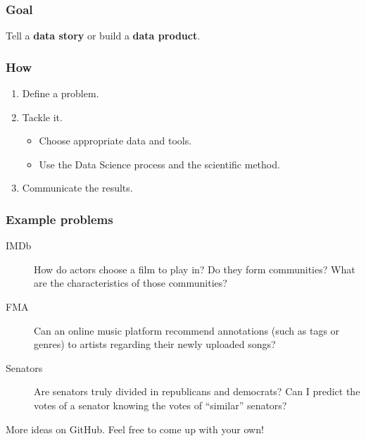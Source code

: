 \documentclass[aspectratio=169]{beamer}
\begin{document}

\begin{frame}
	\frametitle{Goal}
	\begin{center}
		\huge
		Tell a {\color{darkred}\textbf{data story}} or build a {\color{darkred}\textbf{data product}}.
	\end{center}
\end{frame}


\begin{frame}
	\frametitle{How}
	\begin{enumerate}
		\item Define a problem.
		\vfill
		\color{lightgray}
		\item Tackle it.
			\vspace{1em}
			\begin{itemize}
				\color{lightgray}
				\item Choose appropriate data and tools.
				\vspace{1em}
				\item Use the Data Science process and the scientific method.
			\end{itemize}
		\vfill
		\item Communicate the results.
	\end{enumerate}
\end{frame}


\begin{frame}
	\frametitle{Example problems}
	\begin{description}
		\item[IMDb] How do actors choose a film to play in? Do they form communities? What are the characteristics of those communities?
		\vfill
		\item[FMA] Can an online music platform recommend annotations (such as tags or genres) to artists regarding their newly uploaded songs?
		\vfill
		\item[Senators] Are senators truly divided in republicans and democrats? Can I predict the votes of a senator knowing the votes of ``similar'' senators?
	\end{description}
	\vfill
	More ideas on GitHub. Feel free to come up with your own!
\end{frame}
\end{document}
